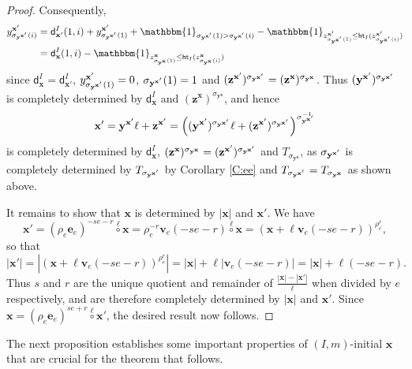 \documentclass[11pt,a4paper,reqno]{amsart}
\numberwithin{equation}{section}
\theoremstyle{plain}
\theoremstyle{definition}
\theoremstyle{remark}
\numberwithin{equation}{section}
\newcommand{\bbone}{\mathbbm{1}}
\newcommand{\bv}{\mathbf{v}}
\newcommand{\bx}{\mathbf{x}}
\newcommand{\by}{\mathbf{y}}
\newcommand{\bz}{\mathbf{z}}
\newcommand{\rr}{\rho}
\newcommand{\Be}{\mathbf{e}}
\newcommand{\CDot}[1]{\mathrel{\overset{#1}{\circ}}}
\newcommand{\Ht}{\mathsf{ht}}
\newcommand{\dd}{\mathsf{d}}
\begin{document}
\begin{proof}
Consequently,
\begin{align*}
y^{\bx'}_{\sigma_{\by^{\bx\smash{'}}}(i)} &= \dd_{\bx'}^I(1,i) +
y^{\bx'}_{\sigma_{\by^{\bx\smash{'}}}(1)} +
\bbone_{\sigma_{\by^{\bx\smash{'}}}(1) > \sigma_{\by^{\bx\smash{'}}}(i)} - \bbone_{z^{\bx'}_{\sigma_{\by^{\bx\smash{'}}}(1)} \leq \Ht_I(z^{\bx'}_{\sigma_{\by^{\bx\smash{'}}}(i)})}\\
&=
\dd_{\bx}^I(1,i) - \bbone_{z^{\bx}_{\sigma_{\by^{\bx}}(1)} \leq \Ht_I(z^{\bx}_{\sigma_{\by^{\bx}}(i)})}
\end{align*}
since $\dd_{\bx}^I = \dd_{\bx'}^I$, $y^{\bx'}_{\sigma_{\by^{\bx\smash{'}}}(1)} = 0$, $\sigma_{\by^{\bx\smash{'}}}(1) = 1$ and
$(\bz^{\bx'})^{\sigma_{\by^{\bx\smash{'}}}} = (\bz^{\bx})^{\sigma_{\by^{\bx}}}$.
Thus $(\by^{\bx'})^{\sigma_{\by^{\bx\smash{'}}}}$ is completely determined by $\dd_{\bx}^I$ and $(\bz^{\bx})^{\sigma_{\by^{\bx}}}$, and hence
$$
\bx' = \by^{\bx'}\ell + \bz^{\bx'} = \left( (\by^{\bx'})^{\sigma_{\by^{\bx\smash{'}}}} \ell + (\bz^{\bx'})^{\sigma_{\by^{\bx\smash{'}}}}\right)^{\sigma_{\by^{\bx\smash{'}}}^{-1}}
$$
is completely determined by $\dd_{\bx}^I$, $(\bz^{\bx})^{\sigma_{\by^{\bx}}} = (\bz^{\bx'})^{\sigma_{\by^{\bx\smash{'}}}}$ and $T_{\sigma_{\by^{\bx}}}$, as $\sigma_{\by^{\bx\smash{'}}}$ is completely determined by $T_{\sigma_{\by^{\bx\smash{'}}}}$ by Corollary \ref{C:ee} and $T_{\sigma_{\by^{\bx\smash{'}}}} = T_{\sigma_{\by^{\bx}}}$ as shown above.

It remains to show that $\bx$ is determined by $|\bx|$ and $\bx'$.
We have
$$
\bx' = (\rr_e\Be_e)^{-se - r} \CDot{\ell} \bx = \rr_e^{-r} \bv_e(-se-r) \CDot{\ell} \bx = (\bx + \ell \bv_e(-se-r))^{\rr_e^r},
$$
so that
$$
|\bx'| = |(\bx + \ell \bv_e(-se-r))^{\rr_e^r}| = |\bx| + \ell|\bv_e(-se-r)| = |\bx| + \ell(-se -r).
$$
Thus $s$ and $r$ are the unique quotient and remainder of $\frac{|\bx| - |\bx'|}{\ell}$ when divided by $e$ respectively, and are therefore completely determined by $|\bx|$ and $\bx'$.
Since $\bx = (\rr_e\Be_e)^{se+r} \CDot{\ell} \bx'$,
the desired result now follows.
\end{proof}

The next proposition establishes some important properties of 
$(I,m)$-initial $\bx$ that are crucial for the theorem that follows.
\end{document}
